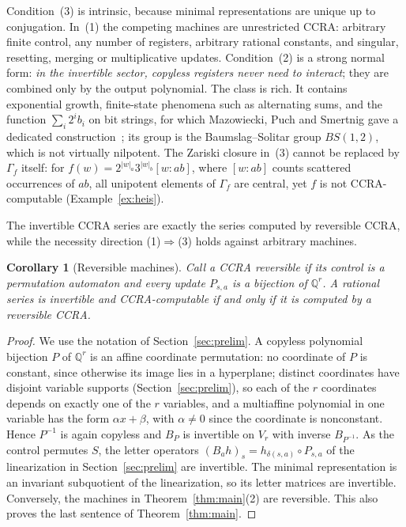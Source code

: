 \documentclass[acmlarge,screen,11pt,nonacm,natbib=false]{acmart}
\newcommand{\Q}{\mathbb{Q}}
\newtheorem{corollary}[theorem]{Corollary}
\theoremstyle{definition}
\begin{document}
Condition~(3) is intrinsic, because minimal representations are unique up to conjugation. In~(1) the competing machines are unrestricted CCRA: arbitrary finite control, any number of registers, arbitrary rational constants, and singular, resetting, merging or multiplicative updates. Condition~(2) is a strong normal form: \emph{in the invertible sector, copyless registers never need to interact}; they are combined only by the output polynomial. The class is rich. It contains exponential growth, finite-state phenomena such as alternating sums, and the function $\sum_i2^ib_i$ on bit strings, for which Mazowiecki, Puch and Smertnig gave a dedicated construction~\cite[Example~27]{MPSfull}; its group is the Baumslag--Solitar group $BS(1,2)$, which is not virtually nilpotent. The Zariski closure in~(3) cannot be replaced by $\Gamma_f$ itself: for $f(w)=2^{|w|_a}3^{|w|_b}[w:ab]$, where $[w:ab]$ counts scattered occurrences of $ab$, all unipotent elements of $\Gamma_f$ are central, yet $f$ is not CCRA-computable (Example~\ref{ex:heis}).

The invertible CCRA series are exactly the series computed by reversible CCRA, while the necessity direction (1)$\Rightarrow$(3) holds against arbitrary machines.

\begin{corollary}[Reversible machines]\label{cor:reversible}
Call a CCRA \emph{reversible} if its control is a permutation automaton and every update $P_{s,a}$ is a bijection of $\Q^r$. A rational series is invertible and CCRA-computable if and only if it is computed by a reversible CCRA.
\end{corollary}
\begin{proof}
We use the notation of Section~\ref{sec:prelim}. A copyless polynomial bijection $P$ of $\Q^r$ is an affine coordinate permutation: no coordinate of $P$ is constant, since otherwise its image lies in a hyperplane; distinct coordinates have disjoint variable supports (Section~\ref{sec:prelim}), so each of the $r$ coordinates depends on exactly one of the $r$ variables, and a multiaffine polynomial in one variable has the form $\alpha x+\beta$, with $\alpha\ne0$ since the coordinate is nonconstant. Hence $P^{-1}$ is again copyless and $B_P$ is invertible on $V_r$ with inverse $B_{P^{-1}}$. As the control permutes $S$, the letter operators $(B_ah)_s=h_{\delta(s,a)}\circ P_{s,a}$ of the linearization in Section~\ref{sec:prelim} are invertible. The minimal representation is an invariant subquotient of the linearization, so its letter matrices are invertible. Conversely, the machines in Theorem~\ref{thm:main}(2) are reversible. This also proves the last sentence of Theorem~\ref{thm:main}.
\end{proof}
\end{document}
